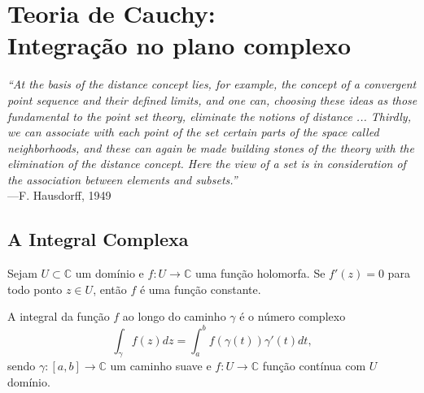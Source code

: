 \chapter[Teoria de Cauchy]{Teoria de Cauchy:\\ Integração no plano complexo}
\chaptermark{}


\hfill%
\begin{minipage}{12cm}
	\begin{flushright}
		\rightskip=0.5cm
		\textit{``At the basis of the distance concept lies, for example, 
		the concept of a convergent point sequence and their defined limits,
		and one can, choosing these ideas as those fundamental to the point 
		set theory, eliminate the notions of distance ... Thirdly, 
		we can associate with each point of the set certain parts of the space
		called neighborhoods, and these can again be made building stones of the 
		theory with the elimination of the distance concept. Here the view
		of a set is in consideration of the association between elements and
		subsets.''}
		\\[0.1cm]
		\rightskip=0.5cm
		---F. Hausdorff, 1949
	\end{flushright}
\end{minipage}



\section{A Integral Complexa}

\begin{lema}
Sejam $U \subset \mathbb{C}$ um domínio e $f:U \to \mathbb{C}$ uma função holomorfa. Se $f'(z) = 0$ para
todo ponto $z\in U$, então $f$ é uma função constante.
\end{lema}

\begin{definicao}
\label{def:integral-complexa}
A integral da função $f$ ao longo do caminho $\gamma$ é
o número complexo
\begin{equation*}
    \int_{\gamma} f(z) dz = \int_a^b f(\gamma(t))\gamma'(t) dt,
\end{equation*}
sendo $\gamma:[a,b]\to\mathbb{C}$ um caminho suave e
$f:U \to \mathbb{C}$ função contínua com $U$ domínio.
\end{definicao}


